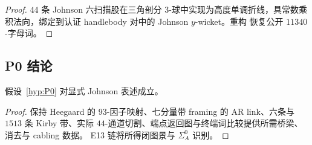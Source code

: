 \begin{proof}
$44$ 条 Johnson 六扫描股在三角剖分 $3$-球中实现为高度单调折线，具常数乘积法向，绑定到认证 handlebody 对中的 Johnson $y$-wicket。重构
恢复公开 $11340$-字母词。
\end{proof}

\subsection{P0 结论}\label{sec:p0-conclusion}

\begin{theorem}\label{thm:P0discharge}
假设~\ref{hyp:P0} 对显式 Johnson 表述成立。
\end{theorem}

\begin{proof}
保持 Heegaard 的 $93$-因子映射、七分量带 framing 的 AR link、六条与
$1513$ 条 Kirby 带、实际 $44$-通道切割、端点返回图与终端词比较提供所需桥梁、消去与 cabling 数据。
E13 链将所得闭图景与 $\Sigma_A^0$ 识别。
\end{proof}
